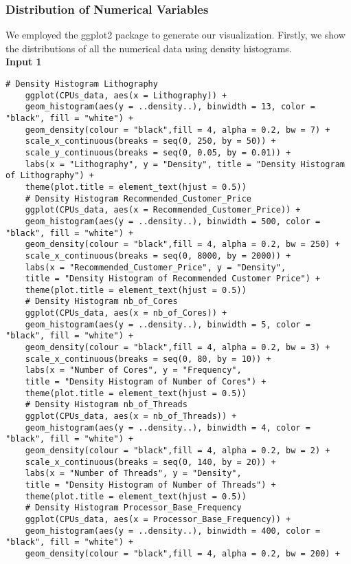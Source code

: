\documentclass[a4paper]{article}
\begin{document}
	\subsubsection{Distribution of Numerical Variables}
	We employed the ggplot2 package to generate our visualization. Firstly, we show the distributions of all the numerical data using density histograms.\\
	\textbf{Input 1}
	\begin{lstlisting}[frame=single, backgroundcolor=\color{gray!10}, breaklines=true, columns=fullflexible]
	# Density Histogram Lithography
	ggplot(CPUs_data, aes(x = Lithography)) +
	geom_histogram(aes(y = ..density..), binwidth = 13, color = "black", fill = "white") +
	geom_density(colour = "black",fill = 4, alpha = 0.2, bw = 7) +
	scale_x_continuous(breaks = seq(0, 250, by = 50)) +
	scale_y_continuous(breaks = seq(0, 0.05, by = 0.01)) +
	labs(x = "Lithography", y = "Density", title = "Density Histogram of Lithography") +
	theme(plot.title = element_text(hjust = 0.5))
	# Density Histogram Recommended_Customer_Price
	ggplot(CPUs_data, aes(x = Recommended_Customer_Price)) +
	geom_histogram(aes(y = ..density..), binwidth = 500, color = "black", fill = "white") +
	geom_density(colour = "black",fill = 4, alpha = 0.2, bw = 250) +
	scale_x_continuous(breaks = seq(0, 8000, by = 2000)) +
	labs(x = "Recommended_Customer_Price", y = "Density", 
	title = "Density Histogram of Recommended Customer Price") +
	theme(plot.title = element_text(hjust = 0.5))
	# Density Histogram nb_of_Cores
	ggplot(CPUs_data, aes(x = nb_of_Cores)) +
	geom_histogram(aes(y = ..density..), binwidth = 5, color = "black", fill = "white") +
	geom_density(colour = "black",fill = 4, alpha = 0.2, bw = 3) +
	scale_x_continuous(breaks = seq(0, 80, by = 10)) +
	labs(x = "Number of Cores", y = "Frequency",
	title = "Density Histogram of Number of Cores") +
	theme(plot.title = element_text(hjust = 0.5))
	# Density Histogram nb_of_Threads
	ggplot(CPUs_data, aes(x = nb_of_Threads)) +
	geom_histogram(aes(y = ..density..), binwidth = 4, color = "black", fill = "white") +
	geom_density(colour = "black",fill = 4, alpha = 0.2, bw = 2) +
	scale_x_continuous(breaks = seq(0, 140, by = 20)) +
	labs(x = "Number of Threads", y = "Density",
	title = "Density Histogram of Number of Threads") +
	theme(plot.title = element_text(hjust = 0.5))
	# Density Histogram Processor_Base_Frequency
	ggplot(CPUs_data, aes(x = Processor_Base_Frequency)) +
	geom_histogram(aes(y = ..density..), binwidth = 400, color = "black", fill = "white") +
	geom_density(colour = "black",fill = 4, alpha = 0.2, bw = 200) +

\end{lstlisting}
\end{document}
